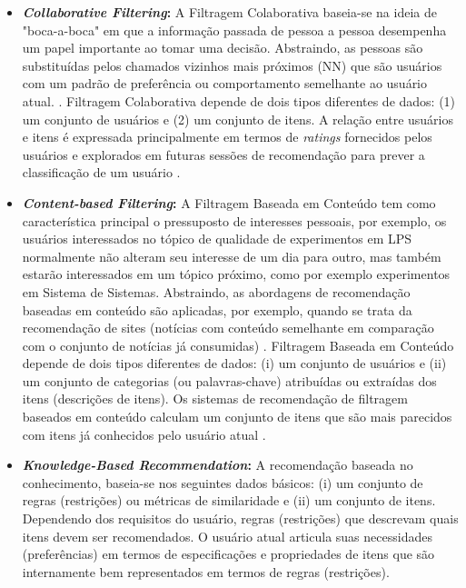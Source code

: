 \begin{itemize}
	\item \textbf{\textit{Collaborative Filtering}:}
	A Filtragem Colaborativa baseia-se na ideia de "boca-a-boca" em que a informação passada de pessoa a pessoa desempenha um papel importante ao tomar uma decisão. Abstraindo, as pessoas são substituídas pelos chamados vizinhos mais próximos (NN) que são usuários com um padrão de preferência ou comportamento semelhante ao usuário atual. \cite{robillard2010recommendation}. Filtragem Colaborativa depende de dois tipos diferentes de dados: (1) um conjunto de usuários e (2) um conjunto de itens. A relação entre usuários e itens é expressada principalmente em termos de \textit{ratings} fornecidos pelos usuários e explorados em futuras sessões de recomendação para prever a classificação de um usuário \cite{robillard2010recommendation}.
	
	\item \textbf{\textit{Content-based Filtering}:}
	A Filtragem Baseada em Conteúdo tem como característica principal o pressuposto de interesses pessoais, por exemplo, os usuários interessados no tópico de qualidade de experimentos em LPS normalmente não alteram seu interesse de um dia para outro, mas também estarão interessados em um tópico próximo, como por exemplo experimentos em Sistema de Sistemas. Abstraindo, as abordagens de recomendação baseadas em conteúdo são aplicadas, por exemplo, quando se trata da recomendação de sites (notícias com conteúdo semelhante em comparação com o conjunto de notícias já consumidas) \cite{robillard2010recommendation}. Filtragem Baseada em Conteúdo depende de dois tipos diferentes de dados: (i) um conjunto de usuários e (ii) um conjunto de categorias (ou palavras-chave) atribuídas ou extraídas dos itens (descrições de itens). Os sistemas de recomendação de filtragem baseados em conteúdo calculam um conjunto de itens que são mais parecidos com itens já conhecidos pelo usuário atual \cite{robillard2010recommendation}.

	\item \textbf{\textit{Knowledge-Based Recommendation}:} 
	A recomendação baseada no conhecimento, baseia-se nos seguintes	dados básicos: (i) um conjunto de regras (restrições) ou métricas de similaridade e (ii) um conjunto de itens. Dependendo dos requisitos do usuário, regras (restrições) que descrevam quais itens devem ser recomendados. O usuário atual articula suas necessidades (preferências) em termos de especificações e propriedades de itens que são internamente bem representados em termos de regras (restrições).
	

\end{itemize}
